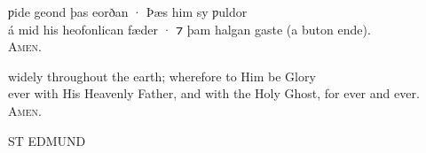 \documentclass[10pt]{book}
\begin{document}
\settowidth{}

\begin{center}
\parbox{\pagelen}{
ƿide geond þas eorðan · Þ\ae{}s him sy ƿuldor \\
\'a mid his heofonlican f\ae{}der · ⁊ þam halgan gaste (a buton ende). \\
\hspace*{1cm}\textsc{Amen.}
}
\end{center}

\clearpage

\settowidth{}

\begin{center}
\parbox{\pagelen}{
widely throughout the earth; wherefore to Him be Glory\\
ever with His Heavenly Father, and with the Holy Ghost, for ever and ever. \\
\hspace*{1cm}\textsc{Amen.}
}
\end{center}






\cleardoublepage


\begin{center}
{\bfseries \lsstyle

\phantom{ }\vfill

{\color{BrickRed} \Large }

\vspace{0.2cm}

{\Huge ST EDMUND }


\vfill

}

\end{center}


\cleardoublepage


\edef\marginnotetextwidth{\the\textwidth}
\end{document}
